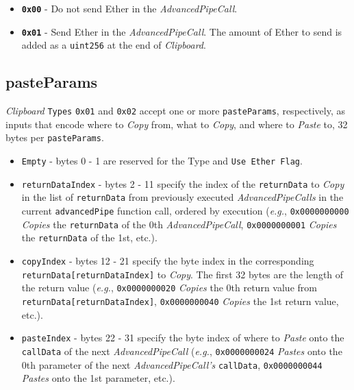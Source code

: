 \documentclass[tikz]{article}
\newcommand{\code}[1]{\texttt{#1}}
\newcommand{\term}[1]{\textsl{#1}}
\begin{document}
\begin{itemize}
    \item \textbf{\code{0x00}} - Do not send Ether in the \term{AdvancedPipeCall}.
    \item \textbf{\code{0x01}} - Send Ether in the \term{AdvancedPipeCall}. The amount of Ether to send is added as a \code{uint256} at the end of \term{Clipboard}.
\end{itemize}

\subsection{pasteParams}
\term{Clipboard} \code{Types} \code{0x01} and \code{0x02} accept one or more \code{pasteParams}, respectively, as inputs that encode where to \term{Copy} from, what to \term{Copy}, and where to \term{Paste} to, 32 bytes per \code{pasteParams}. 

\begin{itemize}
    \item \code{Empty} - bytes 0 - 1 are reserved for the Type and \code{Use Ether Flag}.
    \item \code{returnDataIndex} - bytes 2 - 11 specify the index of the \code{returnData} to \term{Copy} in the list of \code{returnData} from previously executed \term{AdvancedPipeCalls} in the current \code{advancedPipe} function call, ordered by execution (\term{e.g.}, \code{0x0000000000} \term{Copies} the \code{returnData} of the 0th \term{AdvancedPipeCall}, \code{0x0000000001} \term{Copies} the \code{returnData} of the 1st, etc.).
    \item \code{copyIndex} - bytes 12 - 21 specify the byte index in the corresponding \code{returnData[returnDataIndex]} to \term{Copy}. The first 32 bytes are the length of the return value (\term{e.g.}, \code{0x0000000020} \term{Copies} the 0th return value from \code{returnData[returnDataIndex]}, \code{0x0000000040} \term{Copies} the 1st return value, etc.).
    \item \code{pasteIndex} - bytes 22 - 31 specify the byte index of where to \term{Paste} onto the \code{callData} of the next \term{AdvancedPipeCall} (\term{e.g.}, \code{0x0000000024} \term{Pastes} onto the 0th parameter of the next \term{AdvancedPipeCall's} \code{callData}, \code{0x0000000044} \term{Pastes} onto the 1st parameter, etc.). 
\end{itemize}
\end{document}
